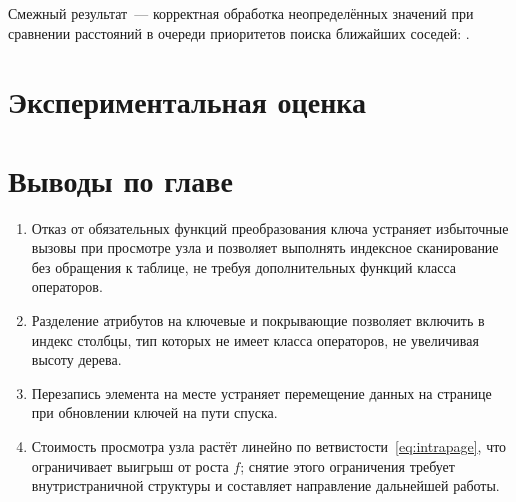 Смежный результат~--- корректная обработка неопределённых значений при
сравнении расстояний в очереди приоритетов поиска ближайших соседей:
.

\section{Экспериментальная оценка}


\section{Выводы по главе}

\begin{enumerate}
\item Отказ от обязательных функций преобразования ключа устраняет избыточные
      вызовы при просмотре узла и позволяет выполнять индексное сканирование без
      обращения к таблице, не требуя дополнительных функций класса операторов.
\item Разделение атрибутов на ключевые и покрывающие позволяет включить в индекс
      столбцы, тип которых не имеет класса операторов, не увеличивая высоту
      дерева.
\item Перезапись элемента на месте устраняет перемещение данных на странице при
      обновлении ключей на пути спуска.
\item Стоимость просмотра узла растёт линейно по ветвистости~\eqref{eq:intrapage},
      что ограничивает выигрыш от роста $f$; снятие этого ограничения требует
      внутристраничной структуры и составляет направление дальнейшей работы.
\end{enumerate}

